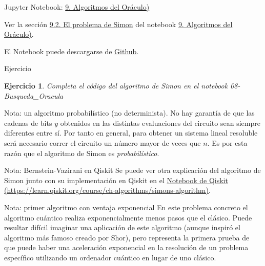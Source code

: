 \documentclass[a4paper,11pt]{book} %
\newtheorem{ejercicio_contador}{Ejercicio}
\newcommand{\Ejercicio}[1]{
		\begin{mybox_gray}{Ejercicio} 
			\begin{ejercicio_contador}
				 #1 
			\end{ejercicio_contador} 
		\end{mybox_gray}
	}
\numberwithin{equation}{chapter}
\begin{document}
	\begin{mybox_orange}{Jupyter Notebook: \href{https://www.scbi.uma.es/web/wp-content/uploads/Jupyterbook/CICC_UMA/Notebooks/html/docs/Part_01/Chapter_09-Busqueda_Oracula_myst.html}{9. Algoritmos del Oráculo)}}
	
	Ver la sección \href{https://www.scbi.uma.es/web/wp-content/uploads/Jupyterbook/CICC_UMA/Notebooks/html/docs/Part_01/Chapter_09-Busqueda_Oracula_myst.html#el-problema-de-simon}{9.2. El problema de Simon} del notebook \href{https://www.scbi.uma.es/web/wp-content/uploads/Jupyterbook/CICC_UMA/Notebooks/html/docs/Part_01/Chapter_09-Busqueda_Oracula_myst.html}{9. Algoritmos del Oráculo)}.
	
	El Notebook puede descargarse de \href{https://github.com/davidcb98/CICC_UMA/blob/master/Notebooks/Part_01/Chapter_09-Busqueda_Oracula.ipynb}{Github}.	
	\end{mybox_orange}


	\Ejercicio{
	Completa el código del algoritmo de Simon en el notebook 08-Busqueda\_Oracula
	}

	\begin{mybox_blue}{Nota: un algoritmo probabilístico (no determinista).}
	No hay garantía de que las cadenas de bits $y$ obtenidos en las distintas evaluaciones del circuito sean siempre diferentes entre sí. 
	Por tanto en general, para obtener un sistema lineal resoluble será necesario correr el circuito un número mayor de veces que $n$.  
	Es por esta razón que el algoritmo de Simon es \textit{probabilístico}.
	\end{mybox_blue}

	\begin{mybox_blue}{Nota: Bernstein-Vazirani en Qiskit}
	Se puede ver otra explicación del algoritmo de  Simon junto con su implementación en Qiskit en el 
	\href{https://learn.qiskit.org/course/ch-algorithms/simons-algorithm}{Notebook de Qiskit (https://learn.qiskit.org/course/ch-algorithms/simons-algorithm)}.
	\end{mybox_blue}
	
	

	\begin{mybox_blue}{Nota: primer algoritmo con ventaja exponencial}
	En este problema concreto el algoritmo cuántico realiza exponencialmente menos pasos que el clásico. Puede resultar difícil imaginar una aplicación de este algoritmo 
	(aunque inspiró el algoritmo más famoso creado por Shor), pero representa la primera prueba de que puede haber una aceleración exponencial en la resolución de un 
	problema específico utilizando un ordenador cuántico en lugar de uno clásico.
	\end{mybox_blue}
\end{document}
